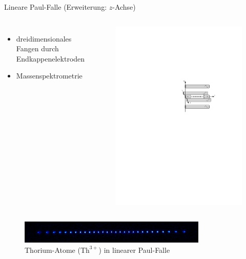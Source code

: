 \documentclass[12pt,xcolor=dvipsnames,professionalfonts]{beamer}
\begin{document}
\begin{frame}{Lineare Paul-Falle (Erweiterung: $z$-Achse)}
	\begin{columns}[c]
		\begin{itemize}
				\setlength\itemsep{1em}
				\item dreidimensionales Fangen durch Endkappenelektroden
				
				\item Massenspektrometrie
		\end{itemize}
		
			\vspace{-0.2cm}
			\begin{figure}[h]
				\centering
				\includegraphics[width=1\textwidth]{./figures/lineare_paulfalle.pdf}
			\end{figure}
	\end{columns}
	
	\vspace{0.2cm}
		
	\begin{figure}[h]
		\centering
		\includegraphics[width=0.8\textwidth]{./figures/29_laser_cooled_ion_chain.jpg}
		\caption{Thorium-Atome ($\mathrm{Th}^{3+}$) in linearer Paul-Falle \cite{campbell}}
	\end{figure}
	
\end{frame}
\end{document}
